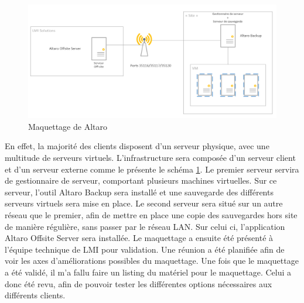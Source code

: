 \documentclass[pfe]{tnreport} %
\begin{document}
\begin{figure}[ht]
 \centering
 \includegraphics[width=15cm]{figures/maquette.png}
 \caption{Maquettage de Altaro}
 \label{fig:maquettage}
\end{figure}
En effet, la majorité des clients disposent d'un serveur physique, avec une multitude de serveurs virtuels. \newline
L'infrastructure sera composée d'un serveur client et d'un serveur externe comme le présente le schéma \ref{fig:maquettage}.\newline
Le premier serveur servira de gestionnaire de serveur, comportant plusieurs machines virtuelles. Sur ce serveur, l'outil Altaro Backup sera installé et une sauvegarde des différents serveurs virtuels sera mise en place. \newline
Le second serveur sera situé sur un autre réseau que le premier, afin de mettre en place une copie des sauvegardes hors site de manière régulière, sans passer par le réseau LAN. Sur celui ci, l'application Altaro Offsite Server sera installée. \newline
Le maquettage a ensuite été présenté à l'équipe technique de LMI pour validation. \newline
Une réunion a été planifiée afin de voir les axes d'améliorations possibles du maquettage. \newline
Une fois que le maquettage a été validé, il m'a fallu faire un listing du matériel pour le maquettage. \newline
Celui a donc été revu, afin de pouvoir tester les différentes options nécessaires aux différents clients.
\end{document}
